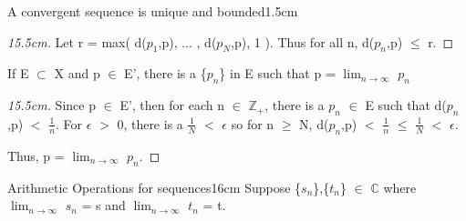 \begin{ltheorem}{A convergent sequence is unique and bounded}{1.5cm}
\begin{proof}[15.5cm]
                Let r = max( d($p_1$,p), ... , d($p_N$,p), 1 ).
                Thus for all n, d($p_n$,p) $\leq$ r.                
            \end{proof}

        \item If E $\subset$ X and p $\in$ E', there is a \{$p_n$\}
            in E such that p = $\lim_{n \rightarrow \infty}$ $p_n$

            \begin{proof}[15.5cm]
                Since p $\in$ E', then for each n $\in$ $\mathbb{Z}_+$,
                there is a $p_n$ $\in$ E such that d($p_n$,p) $<$ $\frac{1}{n}$.
                For $\epsilon$ $>$ 0, there is a $\frac{1}{N}$ $<$ $\epsilon$
                so for n $\geq$ N,
                d($p_n$,p) $<$ $\frac{1}{n}$ $\leq$ $\frac{1}{N}$ $<$ $\epsilon$.

                Thus, p = $\lim_{n \rightarrow \infty}$ $p_n$.                
            \end{proof}
    \end{ltheorem}

    \vspace{0.5cm}



    \begin{wtheorem}{Arithmetic Operations for sequences}{16cm}
        Suppose \{$s_n$\},\{$t_n$\} $\in$ $\mathbb{C}$ where
        $\lim_{n \rightarrow \infty}$ $s_n$ = s and
        $\lim_{n \rightarrow \infty}$ $t_n$ = t.
    \end{wtheorem}

